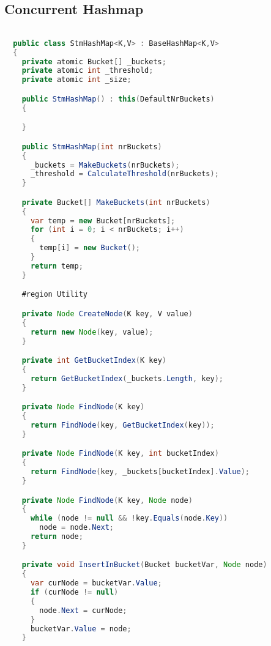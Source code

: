 \subsection{Concurrent Hashmap}
\begin{lstlisting}[label=lst:impl_dining_lib,
  caption={\stmname Based Concurrent Hashmap Implementation},
  language=Java,  
  showspaces=false,
  showtabs=false,
  breaklines=true,
  showstringspaces=false,
  breakatwhitespace=true,
  commentstyle=\color{greencomments},
  keywordstyle=\color{bluekeywords},
  stringstyle=\color{redstrings},
  escapechar=~,
  morekeywords={atomic, retry, orelse, var, get, set, ref, out, readonly, virtual, override, region, endregion, foreach, lock}]  % Start your code-block

  public class StmHashMap<K,V> : BaseHashMap<K,V>
  {
    private atomic Bucket[] _buckets;
    private atomic int _threshold;
    private atomic int _size;

    public StmHashMap() : this(DefaultNrBuckets)
    {

    }

    public StmHashMap(int nrBuckets)
    {
      _buckets = MakeBuckets(nrBuckets);
      _threshold = CalculateThreshold(nrBuckets);
    }

    private Bucket[] MakeBuckets(int nrBuckets)
    {
      var temp = new Bucket[nrBuckets];
      for (int i = 0; i < nrBuckets; i++)
      {
        temp[i] = new Bucket();
      }
      return temp;
    }

    #region Utility

    private Node CreateNode(K key, V value)
    {
      return new Node(key, value);
    }

    private int GetBucketIndex(K key)
    {
      return GetBucketIndex(_buckets.Length, key);
    }

    private Node FindNode(K key)
    {
      return FindNode(key, GetBucketIndex(key));
    }

    private Node FindNode(K key, int bucketIndex)
    {
      return FindNode(key, _buckets[bucketIndex].Value);
    }

    private Node FindNode(K key, Node node)
    {
      while (node != null && !key.Equals(node.Key))
        node = node.Next;
      return node;
    }

    private void InsertInBucket(Bucket bucketVar, Node node)
    {
      var curNode = bucketVar.Value;
      if (curNode != null)
      {
        node.Next = curNode;
      }
      bucketVar.Value = node;
    }


\end{lstlisting}

